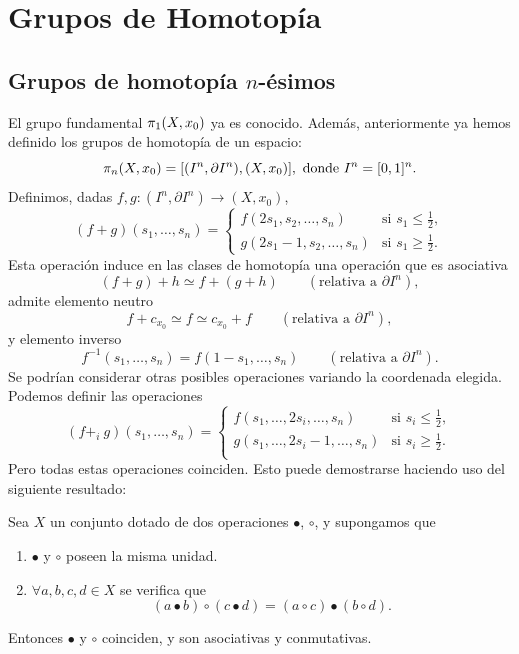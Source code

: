 \chapter{Grupos de Homotopía}
\section{Grupos de homotopía $n$-ésimos}
El grupo fundamental $\pi_{1}(X, x_0)$ ya es conocido. Además, anteriormente ya hemos definido los grupos de homotopía de un espacio:
\[ \pi_{n}(X, x_0) = [(I^n, \partial I^n), (X, x_0)], \text{ donde } I^n = [0,1]^n. \]
Definimos, dadas $f,g : (I^n, \partial I^n) \longrightarrow (X, x_0)$,
\[
(f + g)(s_1, \ldots, s_n) = 
\begin{cases}
f(2s_1, s_2, \ldots, s_n) & \text{si } s_1 \leq \frac{1}{2}, \\
g(2s_1 - 1, s_2, \ldots, s_n) & \text{si } s_1 \geq \frac{1}{2}.
\end{cases}
\]
Esta operación induce en las clases de homotopía una operación que es asociativa
\[
(f + g) + h \simeq f + (g + h) \qquad (\text{relativa a } \partial I^n),
\]
admite elemento neutro
\[
f + c_{x_0} \simeq f \simeq c_{x_0} + f \qquad (\text{relativa a } \partial I^n),
\]
y elemento inverso
\[
f^{-1} (s_1, \ldots, s_n) = f(1 - s_1, \ldots, s_n) \qquad (\text{relativa a } \partial I^n).
\]
Se podrían considerar otras posibles operaciones variando la coordenada elegida. Podemos definir las operaciones
\[
(f +_i \: g)(s_1, \ldots, s_n) = 
\begin{cases}
f(s_1, \ldots, 2s_i, \ldots, s_n) & \text{si } s_i \leq \frac{1}{2}, \\
g(s_1, \ldots, 2s_i -1, \ldots, s_n) & \text{si } s_i \geq \frac{1}{2}. \\
\end{cases}
\]
Pero todas estas operaciones coinciden. Esto puede demostrarse haciendo uso del siguiente resultado:
\begin{prop}
Sea $X$ un conjunto dotado de dos operaciones $\bullet$, $\circ$, y supongamos que 
\begin{enumerate}
\item $\bullet$ y $\circ$ poseen la misma unidad.
\item $\forall a,b,c,d \in X$ se verifica que
\[
(a \bullet b) \circ (c \bullet d) = (a \circ c) \bullet (b \circ d) .
\]
\end{enumerate}
Entonces $\bullet$ y $\circ$ coinciden, y son asociativas y conmutativas.
\end{prop}
